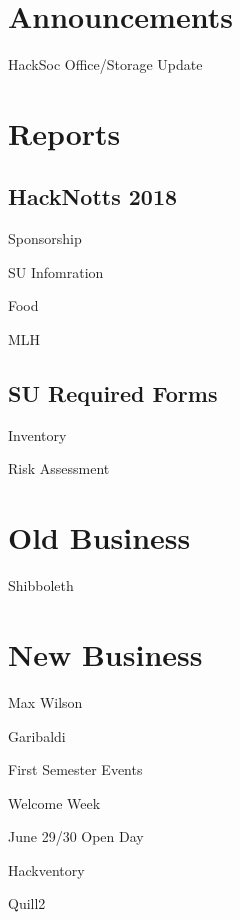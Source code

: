 \documentclass[11pt,hacksoc,agenda]{meetingmins}
\begin{document}
\maketitle

\section{Announcements}
\begin{items}
\item
HackSoc Office/Storage Update

\end{items}

\section{Reports}

\subsection{HackNotts 2018}
\begin{hiddensubitems}
	\item
	Sponsorship
	
	\item
	SU Infomration
	
	\item
	Food
	
	\item
	MLH
\end{hiddensubitems}


\subsection{SU Required Forms}
\begin{hiddensubitems}
	\item
	Inventory
	
	\item
	Risk Assessment
	
\end{hiddensubitems}


\section{Old Business}
\begin{items}
	\item
	Shibboleth
\end{items}

\section{New Business}
\begin{items}
	\item
	Max Wilson
	
	\item
	Garibaldi
	
	\item
	First Semester Events
	
	\item
	Welcome Week
	
	\item
	June 29/30 Open Day
	
	\item
	Hackventory
	
	\item
	Quill2
\end{items}

\vspace{1em}
\end{document}

